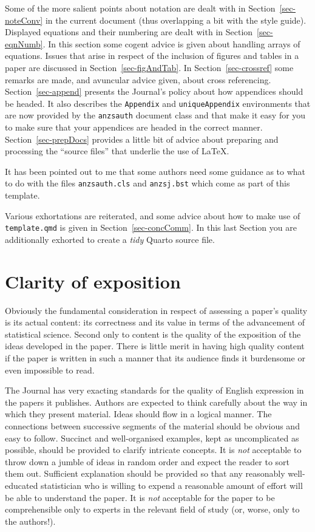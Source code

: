 \documentclass[
doublespace,
  times]{anzsauth}
\begin{document}
Some of the more salient points about notation are dealt with in
Section~\ref{sec-noteConv} in the current document (thus overlapping a
bit with the style guide). Displayed equations and their numbering are
dealt with in Section~\ref{sec-eqnNumb}. In this section some cogent
advice is given about handling arrays of equations. Issues that arise in
respect of the inclusion of figures and tables in a paper are discussed
in Section~\ref{sec-figAndTab}. In Section~\ref{sec-crossref} some
remarks are made, and avuncular advice given, about cross referencing.
Section~\ref{sec-append} presents the Journal's policy about how
appendices should be headed. It also describes the \texttt{Appendix} and
\texttt{uniqueAppendix} environments that are now provided by the
\texttt{anzsauth} document class and that make it easy for you to make
sure that your appendices are headed in the correct manner.
Section~\ref{sec-prepDocs} provides a little bit of advice about
preparing and processing the ``source files'' that underlie the use of
\LaTeX.

It has been pointed out to me that some authors need some guidance as to
what to do with the files \texttt{anzsauth.cls} and \texttt{anzsj.bst}
which come as part of this template.

Various exhortations are reiterated, and some advice about how to make
use of \texttt{template.qmd} is given in Section~\ref{sec-concComm}. In
this last Section you are additionally exhorted to create a \emph{tidy}
Quarto source file.

\section{Clarity of exposition}\label{sec-clarExpos}

Obviously the fundamental consideration in respect of assessing a
paper's quality is its actual content: its correctness and its value in
terms of the advancement of statistical science. Second only to content
is the quality of the exposition of the ideas developed in the paper.
There is little merit in having high quality content if the paper is
written in such a manner that its audience finds it burdensome or even
impossible to read.

The Journal has very exacting standards for the quality of English
expression in the papers it publishes. Authors are expected to think
carefully about the way in which they present material. Ideas should
flow in a logical manner. The connections between successive segments of
the material should be obvious and easy to follow. Succinct and
well-organised examples, kept as uncomplicated as possible, should be
provided to clarify intricate concepts. It is \emph{not} acceptable to
throw down a jumble of ideas in random order and expect the reader to
sort them out. Sufficient explanation should be provided so that any
reasonably well-educated statistician who is willing to expend a
reasonable amount of effort will be able to understand the paper. It is
\emph{not} acceptable for the paper to be comprehensible only to experts
in the relevant field of study (or, worse, only to the authors!).
\end{document}
